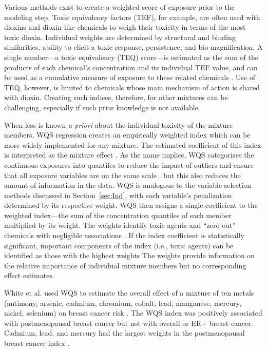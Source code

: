 Various methods exist to create a weighted score of exposure prior to the modeling step. Toxic equivalency factors (TEF), for example, are often used with dioxins and dioxin-like chemicals to weigh their toxicity in terms of the most toxic dioxin. Individual weights are determined by structural and binding similarities, ability to elicit a toxic response, persistence, and bio-magnification. A single number---a toxic equivalency (TEQ) score---is estimated as the sum of the products of each chemical's concentration and its individual TEF value, and can be used as a cumulative measure of exposure to these related chemicals \citep{van20062005, mitro2015cross}. Use of TEQ, however, is limited to chemicals whose main mechanism of action is shared with dioxin. Creating such indices, therefore, for other mixtures can be challenging, especially if such prior knowledge is not available.

When less is known \textit{a priori} about the individual toxicity of the mixture members, WQS regression creates an empirically weighted index which can be more widely implemented for any mixture. The estimated coefficient of this index is interpreted as the mixture effect \citep{carrico15}. As the name implies, WQS categorizes the continuous exposures into quantiles to reduce the impact of outliers and ensure that all exposure variables are on the same scale \citep{carrico15, gennings2013cohort}. but this also reduces the amount of information in the data. WQS is analogous to the variable selection methods discussed in Section~\ref{sec:Ind}, with each variable's penalization determined by its respective weight. WQS then assigns a single coefficient to the weighted index---the sum of the concentration quantiles of each member multiplied by its weight. The weights identify toxic agents and ``zero out'' chemicals with negligible associations \citep{carrico15, christensen2013multiple}. If the index coefficient is statistically significant, important components of the index (i.e., toxic agents) can be identified as those with the highest weights \citep{carrico15} The weights provide information on the relative importance of individual mixture members but no corresponding effect estimates. 

White et al. used WQS to estimate the overall effect of a mixture of ten metals (antimony, arsenic, cadmium, chromium, cobalt, lead, manganese, mercury, nickel, selenium) on breast cancer risk \citep{white2018metallic}. The WQS index was positively associated with postmenopausal breast cancer but not with overall or ER+ breast cancer. Cadmium, lead, and mercury had the largest weights in the postmenopausal breast cancer index \citep{white2018metallic}.

